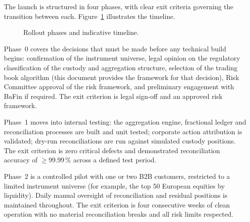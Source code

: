\documentclass[12pt,a4paper]{report}
\begin{document}
The launch is structured in four phases, with clear exit criteria governing the
transition between each. Figure~\ref{fig:phases} illustrates the timeline.

\begin{figure}[H]
\centering
{}
\caption{Rollout phases and indicative timeline.}
\label{fig:phases}
\end{figure}

Phase~0 covers the decisions that must be made before any technical build begins:
confirmation of the instrument universe, legal opinion on the regulatory classification
of the custody and aggregation structure, selection of the trading book algorithm (this
document provides the framework for that decision), Risk Committee approval of the risk
framework, and preliminary engagement with BaFin if required. The exit criterion is
legal sign-off and an approved risk framework.

Phase~1 moves into internal testing: the aggregation engine, fractional ledger and
reconciliation processes are built and unit tested; corporate action attribution is
validated; dry-run reconciliations are run against simulated custody positions. The exit
criterion is zero critical defects and demonstrated reconciliation accuracy of
$\geq$99.99\,\% across a defined test period.

Phase~2 is a controlled pilot with one or two B2B customers, restricted to a limited
instrument universe (for example, the top 50 European equities by liquidity). Daily
manual oversight of reconciliation and residual positions is maintained throughout.
The exit criterion is four consecutive weeks of clean operation with no material
reconciliation breaks and all risk limits respected.
\end{document}
